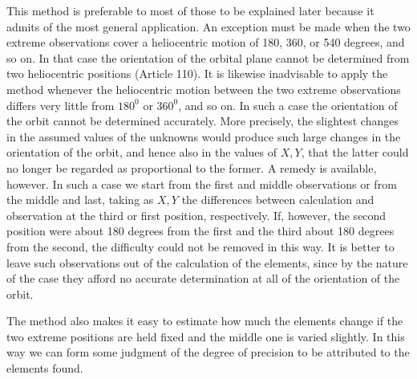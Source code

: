 This method is preferable to most of those to be explained later because it admits of the most general application. An exception must be made when the two extreme observations cover a heliocentric motion of 180, 360, or 540 degrees, and so on. In that case the orientation of the orbital plane cannot be determined from two heliocentric positions (Article 110). It is likewise inadvisable to apply the method whenever the heliocentric motion between the two extreme observations differs very little from $180^0$ or $360^0$, and so on. In such a case the orientation of the orbit cannot be determined accurately. More precisely, the slightest changes in the assumed values of the unknowns would produce such large changes in the orientation of the orbit, and hence also in the values of $X,Y$, that the latter could no longer be regarded as proportional to the former. A remedy is available, however. In such a case we start from the first and middle observations or from the middle and last, taking as $X,Y$ the differences between calculation and observation at the third or first position, respectively. If, however, the second position were about 180 degrees from the first and the third about 180 degrees from the second, the difficulty could not be removed in this way. It is better to leave such observations out of the calculation of the elements, since by the nature of the case they afford no accurate determination at all of the orientation of the orbit.

The method also makes it easy to estimate how much the elements change if the two extreme positions are held fixed and the middle one is varied slightly. In this way we can form some judgment of the degree of precision to be attributed to the elements found.
